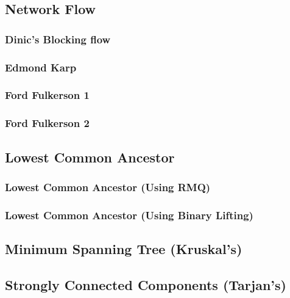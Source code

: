 \documentclass[twocolumn, landscape]{report}
\begin{document}
            \subsection{Network Flow}
                \subsubsection{Dinic's Blocking flow}
                
                \subsubsection{Edmond Karp}
                
                \subsubsection{Ford Fulkerson 1}
                
                \subsubsection{Ford Fulkerson 2}
                
            \subsection{Lowest Common Ancestor}
                \subsubsection{Lowest Common Ancestor (Using RMQ)}
                
                \subsubsection{Lowest Common Ancestor (Using Binary Lifting)}
                
            \subsection{Minimum Spanning Tree (Kruskal's)}
            
            \subsection{Strongly Connected Components (Tarjan's)}
            
\end{document}
